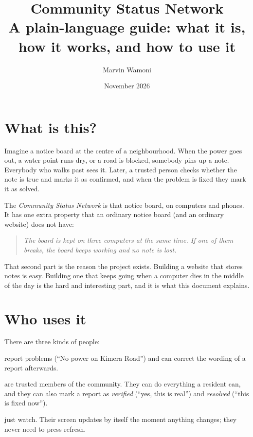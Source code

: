 \documentclass[11pt,a4paper]{article}
\title{\textbf{Community Status Network}\\[4pt]\large A plain-language guide: what it is, how it works, and how to use it}
\author{Marvin Wamoni}
\date{November 2026}
\begin{document}
\maketitle

\section{What is this?}

Imagine a notice board at the centre of a neighbourhood. When the power goes out, a water point
runs dry, or a road is blocked, somebody pins up a note. Everybody who walks past sees it. Later,
a trusted person checks whether the note is true and marks it as confirmed, and when the problem is
fixed they mark it as solved.

The \emph{Community Status Network} is that notice board, on computers and phones. It has one
extra property that an ordinary notice board (and an ordinary website) does not have:

\begin{quote}
\emph{The board is kept on three computers at the same time. If one of them breaks, the board
keeps working and no note is lost.}
\end{quote}

That second part is the reason the project exists. Building a website that stores notes is easy.
Building one that keeps going when a computer dies in the middle of the day is the hard and
interesting part, and it is what this document explains.

\section{Who uses it}

There are three kinds of people:

\begin{description}[leftmargin=2.2cm,style=nextline]
\item[Residents] report problems (``No power on Kimera Road'') and can correct the wording of a
report afterwards.
\item[Moderators] are trusted members of the community. They can do everything a resident can,
and they can also mark a report as \emph{verified} (``yes, this is real'') and \emph{resolved}
(``this is fixed now'').
\item[Viewers] just watch. Their screen updates by itself the moment anything changes; they never
need to press refresh.
\end{description}
\end{document}
